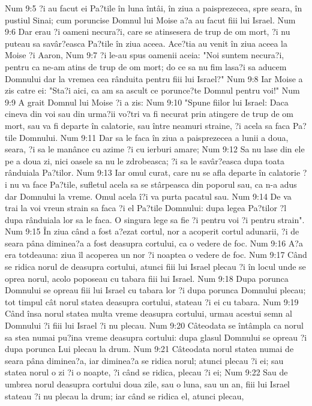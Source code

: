 Num 9:5  ?i au facut ei Pa?tile în luna întâi, în ziua a paisprezecea, spre seara, în pustiul Sinai; cum poruncise Domnul lui Moise a?a au facut fiii lui Israel.
Num 9:6  Dar erau ?i oameni necura?i, care se atinsesera de trup de om mort, ?i nu puteau sa savâr?easca Pa?tile în ziua aceea. Ace?tia au venit în ziua aceea la Moise ?i Aaron,
Num 9:7  ?i le-au spus oamenii aceia: "Noi suntem necura?i, pentru ca ne-am atins de trup de om mort; do ce sa nu fim lasa?i sa aducem Domnului dar la vremea cea rânduita pentru fiii lui Israel?"
Num 9:8  Iar Moise a zis catre ei: "Sta?i aici, ca am sa ascult ce porunce?te Domnul pentru voi!"
Num 9:9  A grait Domnul lui Moise ?i a zis:
Num 9:10  "Spune fiilor lui Israel: Daca cineva din voi sau din urma?ii vo?tri va fi necurat prin atingere de trup de om mort, sau va fi departe în calatorie, sau între neamuri straine, ?i acela sa faca Pa?tile Domnului.
Num 9:11  Dar sa le faca în ziua a paisprezecea a lunii a doua, seara, ?i sa le manânce cu azime ?i cu ierburi amare;
Num 9:12  Sa nu lase din ele pe a doua zi, nici oasele sa nu le zdrobeasca; ?i sa le savâr?easca dupa toata rânduiala Pa?tilor.
Num 9:13  Iar omul curat, care nu se afla departe în calatorie ?i nu va face Pa?tile, sufletul acela sa se stârpeasca din poporul sau, ca n-a adus dar Domnului la vreme. Omul acela î?i va purta pacatul sau.
Num 9:14  De va trai la voi vreun strain sa faca ?i el Pa?tile Domnului: dupa legea Pa?tilor ?l dupa rânduiala lor sa le faca. O singura lege sa fie ?i pentru voi ?i pentru strain".
Num 9:15  În ziua când a fost a?ezat cortul, nor a acoperit cortul adunarii, ?i de seara pâna diminea?a a fost deasupra cortului, ca o vedere de foc.
Num 9:16  A?a era totdeauna: ziua îl acoperea un nor ?i noaptea o vedere de foc.
Num 9:17  Când se ridica norul de deasupra cortului, atunci fiii lui Israel plecau ?i în locul unde se oprea norul, acolo poposeau cu tabara fiii lui Israel.
Num 9:18  Dupa porunca Domnului se opreau fiii lui Israel cu tabara lor ?i dupa porunca Domnului plecau; tot timpul cât norul statea deasupra cortului, stateau ?i ei cu tabara.
Num 9:19  Când însa norul statea multa vreme deasupra cortului, urmau acestui semn al Domnului ?i fiii lui Israel ?i nu plecau.
Num 9:20  Câteodata se întâmpla ca norul sa stea numai pu?ina vreme deasupra cortului: dupa glasul Domnului se opreau ?i dupa porunca Lui plecau la drum.
Num 9:21  Câteodata norul statea numai de seara pâna diminea?a, iar diminea?a se ridica norul; atunci plecau ?i ei; sau statea norul o zi ?i o noapte, ?i când se ridica, plecau ?i ei;
Num 9:22  Sau de umbrea norul deasupra cortului doua zile, sau o luna, sau un an, fiii lui Israel stateau ?i nu plecau la drum; iar când se ridica el, atunci plecau,
